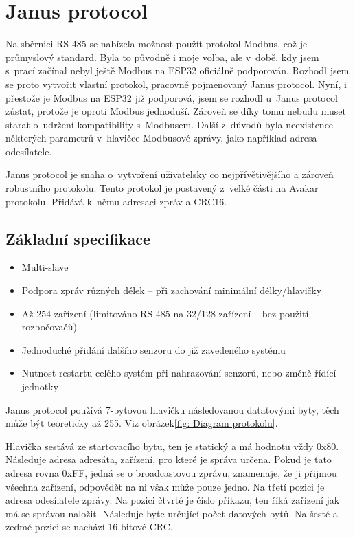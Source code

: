 \chapter{Janus protocol}
Na sběrnici RS-485 se nabízela možnost použít protokol Modbus, což je průmyslový standard.
Byla to původně i moje volba, ale v~době, kdy jsem s~prací začínal nebyl ještě Modbus na ESP32 oficiálně podporován.
Rozhodl jsem se proto vytvořit vlastní protokol, pracovně pojmenovaný Janus protocol.
Nyní, i přestože je Modbus na ESP32 již podporová, jsem se rozhodl u~Janus protocol zůstat, protože je oproti Modbus jednoduší.
Zároveň se díky tomu nebudu muset starat o~udržení kompatibility s~Modbusem.
Další z~důvodů byla neexistence některých parametrů v~hlavičce Modbusové zprávy, jako například adresa odesílatele. 

Janus protocol je snaha o~vytvoření uživatelsky co nejpřívětivějšího a zároveň robustního protokolu.
Tento protokol je postavený z~velké části na Avakar protokolu.
Přidává k~němu adresaci zpráv a CRC16.


\section{Základní specifikace}
\begin{itemize}
    \item Multi-slave
    \item Podpora zpráv různých délek -- při zachování minimální délky/hlavičky
    \item Až 254 zařízení (limitováno RS-485 na 32/128 zařízení -- bez použití rozbočovačů)
    \item Jednoduché přidání dalšího senzoru do již zavedeného systému
    \item Nutnost restartu celého systém při nahrazování senzorů, nebo změně řídící jednotky
\end{itemize}

Janus protocol používá 7-bytovou hlavičku následovanou datatovými byty, těch může být teoreticky až 255.
Viz obrázek\ref{fig: Diagram protokolu}.

Hlavička sestává ze startovacího bytu, ten je statický a má hodnotu vždy 0x80.
Následuje adresa adresáta, zařízení, pro které je správa určena.
Pokud je tato adresa rovna 0xFF, jedná se o broadcastovou zprávu, znamenaje, že ji přijmou všechna zařízení, odpovědět na ni však může pouze jedno.
Na třetí pozici je adresa odesílatele zprávy.
Na pozici čtvrté je číslo příkazu, ten říká zařízení jak má se správou naložit.
Následuje byte určující počet datových bytů.
Na šesté a zedmé pozici se nachází 16-bitové CRC.


